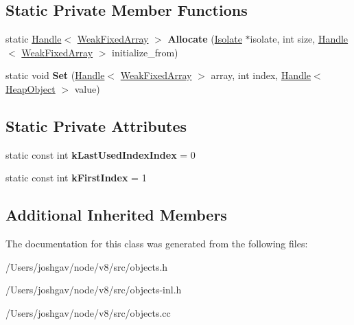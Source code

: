 \subsection*{Static Private Member Functions}
\begin{DoxyCompactItemize}
\item 
static \hyperlink{classv8_1_1internal_1_1_handle}{Handle}$<$ \hyperlink{classv8_1_1internal_1_1_weak_fixed_array}{Weak\+Fixed\+Array} $>$ {\bfseries Allocate} (\hyperlink{classv8_1_1internal_1_1_isolate}{Isolate} $\ast$isolate, int size, \hyperlink{classv8_1_1internal_1_1_handle}{Handle}$<$ \hyperlink{classv8_1_1internal_1_1_weak_fixed_array}{Weak\+Fixed\+Array} $>$ initialize\+\_\+from)\hypertarget{classv8_1_1internal_1_1_weak_fixed_array_a712b6f2ae641cebf0de91a65fcd1af66}{}\label{classv8_1_1internal_1_1_weak_fixed_array_a712b6f2ae641cebf0de91a65fcd1af66}

\item 
static void {\bfseries Set} (\hyperlink{classv8_1_1internal_1_1_handle}{Handle}$<$ \hyperlink{classv8_1_1internal_1_1_weak_fixed_array}{Weak\+Fixed\+Array} $>$ array, int index, \hyperlink{classv8_1_1internal_1_1_handle}{Handle}$<$ \hyperlink{classv8_1_1internal_1_1_heap_object}{Heap\+Object} $>$ value)\hypertarget{classv8_1_1internal_1_1_weak_fixed_array_a4d27d297537efbf603c817dc416b2a41}{}\label{classv8_1_1internal_1_1_weak_fixed_array_a4d27d297537efbf603c817dc416b2a41}

\end{DoxyCompactItemize}
\subsection*{Static Private Attributes}
\begin{DoxyCompactItemize}
\item 
static const int {\bfseries k\+Last\+Used\+Index\+Index} = 0\hypertarget{classv8_1_1internal_1_1_weak_fixed_array_a579ca1ebe9e21c46d2ee1314e7e9d850}{}\label{classv8_1_1internal_1_1_weak_fixed_array_a579ca1ebe9e21c46d2ee1314e7e9d850}

\item 
static const int {\bfseries k\+First\+Index} = 1\hypertarget{classv8_1_1internal_1_1_weak_fixed_array_ab69956b06beaea6591b7cdfabf9f2259}{}\label{classv8_1_1internal_1_1_weak_fixed_array_ab69956b06beaea6591b7cdfabf9f2259}

\end{DoxyCompactItemize}
\subsection*{Additional Inherited Members}


The documentation for this class was generated from the following files\+:\begin{DoxyCompactItemize}
\item 
/\+Users/joshgav/node/v8/src/objects.\+h\item 
/\+Users/joshgav/node/v8/src/objects-\/inl.\+h\item 
/\+Users/joshgav/node/v8/src/objects.\+cc\end{DoxyCompactItemize}
